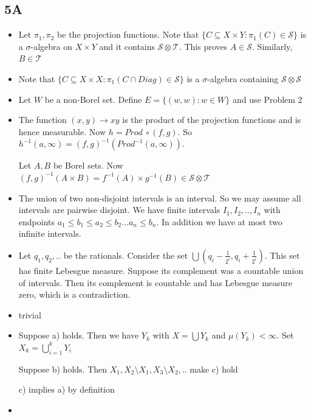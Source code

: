 \documentclass{article}
\begin{document}
\subsection*{5A}
\begin{itemize}
    \item [1] Let $\pi_1,\pi_2$ be the projection functions. Note that $\{C \subseteq X \times Y:\pi_1(C)\in \mathcal{S}\}$ is a $\sigma$-algebra on $X \times Y$ and it contains $\mathcal{S}\otimes\mathcal{T}$. This proves $A \in \mathcal{S}$. Similarly, $B \in \mathcal{T}$
    
    \item[2] Note that $\{C \subseteq X \times X:\pi_1(C \cap Diag)\in \mathcal{S}\}$ is a $\sigma$-algebra containing $\mathcal{S} \otimes \mathcal{S}$

    \item [3] Let $W$ be a non-Borel set. Define $E=\{(w,w):w \in W\}$ and use Problem 2

    \item [4] The function $(x,y)\to xy$ is the product of the projection functions and is hence measurable. Now $h=Prod \ \circ (f,g)$. So $h^{-1}(a,\infty)=(f,g)^{-1}(Prod^{-1}(a,\infty))$. 

    Let $A,B$ be Borel sets. Now $(f,g)^{-1}(A\times B)=f^{-1}(A)\times g^{-1}(B)\in \mathcal{S}\otimes\mathcal{T}$

    \item[5] The union of two non-disjoint intervals is an interval. So we may assume all intervals are pairwise disjoint. We have finite intervals $I_1,I_2,..,I_n$ with endpoints $a_1\leq b_1\leq a_2 \leq b_2...a_n\leq b_n$. In addition we have at most two infinite intervals.

    \item [6] Let $q_1,q_2,..$ be the rationals. Consider the set $\bigcup(q_i-\frac{1}{2^i},q_i+\frac{1}{2^i})$. This set has finite Lebesgue measure. Suppose its complement was a countable union of intervals. Then its complement is countable and has Lebesgue measure zero, which is a contradiction.

    \item[7] trivial

    \item[8] Suppose a) holds. Then we have $Y_k$ with $X=\bigcup Y_k$ and $\mu(Y_k)<\infty$. Set $X_k=\bigcup_{i=1}^k Y_i$ 

    Suppose b) holds. Then $X_1,X_2 \setminus X_1,X_3\setminus X_2,..$ make c) hold

    c) implies a) by definition

    \item[9] 

\end{itemize}
\end{document}
